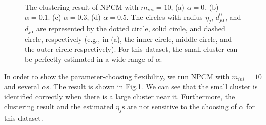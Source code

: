\documentclass[conference]{IEEEtran}
\theoremstyle{definition}
\begin{document}
\begin{figure}[tb]
   \quad
\caption{The clustering result of NPCM with $m_{ini}=10$, (a) $\alpha=0$, (b) $\alpha=0.1.$ (c) $\alpha=0.3$, (d) $\alpha=0.5$.
The circles with radius $\eta_j$, $d_{j\alpha}^0$, and $d_{j\alpha}$ are represented by the dotted circle, solid circle, and dashed circle, respectively (e.g., in (a), the inner circle, middle circle, and the outer circle respectively). For this dataset, the small cluster can be perfectly estimated in  a wide range of $\alpha$. }
\label{fig_small_cluster}
\end{figure}

In order to show the parameter-choosing flexibility, we run NPCM with $m_{ini}=10$ and several $\alpha\text{s}$. The result is shown in Fig.\ref{fig_small_cluster}.
We can see that the small cluster is identified correctly when there is a large cluster near it. Furthermore, the clustering result and the estimated $\eta_j\text{s}$ are not sensitive to the choosing of $\alpha$ for this dataset.
\end{document}
